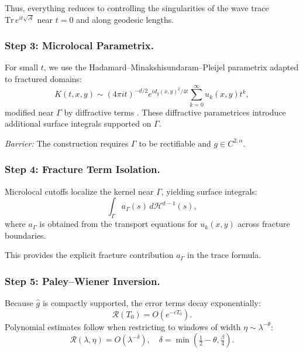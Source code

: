 Thus, everything reduces to controlling the singularities of the
wave trace $\mathrm{Tr}\,e^{it\sqrt{\mathcal{A}}}$ near $t=0$
and along geodesic lengths.


\subsubsection{Step 3: Microlocal Parametrix.}
For small $t$, we use the Hadamard–Minakshisundaram–Pleijel parametrix
adapted to fractured domains:
\[
K(t,x,y) \sim (4\pi it)^{-d/2}e^{i d_g(x,y)^2/4t}
\sum_{k=0}^\infty u_k(x,y) t^k,
\]
modified near $\Gamma$ by diffractive terms \cite{Melrose1975}.
These diffractive parametrices introduce additional surface integrals
supported on $\Gamma$.

\emph{Barrier:} The construction requires $\Gamma$ to be rectifiable
and $g \in C^{2,\alpha}$.


\subsubsection{Step 4: Fracture Term Isolation.}
Microlocal cutoffs localize the kernel near $\Gamma$, yielding
surface integrals:
\[
\int_{\Gamma} a_\Gamma(s)\, d\mathcal{H}^{d-1}(s),
\]
where $a_\Gamma$ is obtained from the transport equations
for $u_k(x,y)$ across fracture boundaries.

This provides the explicit fracture contribution $a_\Gamma$ in the
trace formula.


\subsubsection{Step 5: Paley–Wiener Inversion.}
Because $\widehat{g}$ is compactly supported, the error terms decay
exponentially:
\[
\mathcal{R}(T_0) = O(e^{-cT_0}).
\]
Polynomial estimates follow when restricting to windows of width
$\eta \sim \lambda^{-\theta}$:
\[
\mathcal{R}(\lambda, \eta) = O(\lambda^{-\delta}),
\quad \delta = \min\left(\tfrac{1}{2}-\theta,\tfrac{\beta}{4}\right).
\]

